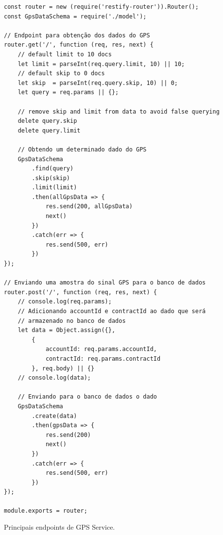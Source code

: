 \begin{code}
\begin{verbatim}
const router = new (require('restify-router')).Router();
const GpsDataSchema = require('./model');

// Endpoint para obtenção dos dados do GPS
router.get('/', function (req, res, next) {
	// default limit to 10 docs
	let limit = parseInt(req.query.limit, 10) || 10; 
	// default skip to 0 docs
	let skip  = parseInt(req.query.skip, 10) || 0; 
	let query = req.params || {};

	// remove skip and limit from data to avoid false querying
	delete query.skip
	delete query.limit

	// Obtendo um determinado dado do GPS
	GpsDataSchema
		.find(query)
		.skip(skip)
		.limit(limit)
		.then(allGpsData => {
			res.send(200, allGpsData)
			next()
		})
		.catch(err => {
			res.send(500, err)
		})
});

// Enviando uma amostra do sinal GPS para o banco de dados
router.post('/', function (req, res, next) {
	// console.log(req.params);
	// Adicionando accountId e contractId ao dado que será 
	// armazenado no banco de dados
	let data = Object.assign({}, 
		{ 	
			accountId: req.params.accountId, 
			contractId: req.params.contractId 
		}, req.body) || {}
	// console.log(data);

	// Enviando para o banco de dados o dado
	GpsDataSchema
		.create(data)
		.then(gpsData => {
			res.send(200)
			next()
		})
		.catch(err => {
			res.send(500, err)
		})
});

module.exports = router;
\end{verbatim}
\caption{Principais endpoints de GPS Service.}
\label{lst:gps_service_endpoint}
\end{code}








